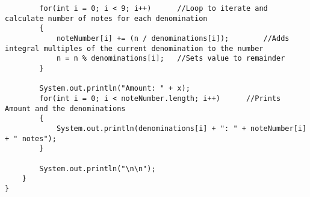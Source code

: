 \documentclass[ProgramminAssignment.tex]{subfiles}
\begin{document}
\begin{lstlisting}
		for(int i = 0; i < 9; i++)		//Loop to iterate and calculate number of notes for each denomination
		{
			noteNumber[i] += (n / denominations[i]);		//Adds integral multiples of the current denomination to the number
			n = n % denominations[i];	//Sets value to remainder
		}
		
		System.out.println("Amount: " + x);
		for(int i = 0; i < noteNumber.length; i++)		//Prints Amount and the denominations
		{
			System.out.println(denominations[i] + ": " + noteNumber[i] + " notes");
		}
		
		System.out.println("\n\n");
	}
}

\end{lstlisting}
\end{document}
